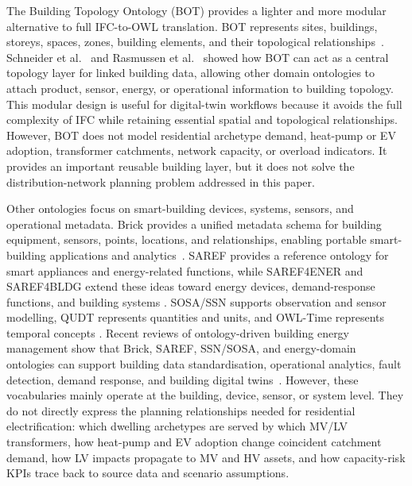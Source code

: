 \documentclass[preprint,12pt]{elsarticle}
\begin{document}
The Building Topology Ontology (BOT) provides a lighter and more modular
alternative to full IFC-to-OWL translation.
BOT represents sites, buildings, storeys, spaces, zones, building elements,
and their topological relationships~\cite{rasmussen_bot_2020}.
Schneider et al.~\cite{schneider_towards_2017} and Rasmussen et
al.~\cite{mads_holten_rasmussen_pieter_pauwels_maxime_lefrancois_georg_ferdinand_schneider_building_nodate} showed how BOT can act as a central topology
layer for linked building data, allowing other domain ontologies to attach
product, sensor, energy, or operational information to building topology.
This modular design is useful for digital-twin workflows because it avoids
the full complexity of IFC while retaining essential spatial and
topological relationships.
However, BOT does not model residential archetype demand, heat-pump or EV
adoption, transformer catchments, network capacity, or overload indicators.
It provides an important reusable building layer, but it does not solve the
distribution-network planning problem addressed in this paper.

Other ontologies focus on smart-building devices, systems, sensors, and
operational metadata.
Brick provides a unified metadata schema for building equipment, sensors,
points, locations, and relationships, enabling portable smart-building
applications and analytics~\cite{balaji_brick_2016, balaji_brick_2018, fierro_mortardata_2020}.
SAREF provides a reference ontology for smart appliances and energy-related
functions, while SAREF4ENER and SAREF4BLDG extend these ideas toward energy
devices, demand-response functions, and building systems
\cite{daniele_saref_2015, noauthor_saref4bldg_nodate, poveda-villalon_extending_nodate}.
SOSA/SSN supports observation and sensor modelling, QUDT represents
quantities and units, and OWL-Time represents temporal concepts
\cite{haller_semantic_2019,compton_ssn_2012,qudt_specification_2020,
cox_owltime_2017}.
Recent reviews of ontology-driven building energy management show that
Brick, SAREF, SSN/SOSA, and energy-domain ontologies can support building
data standardisation, operational analytics, fault detection, demand
response, and building digital twins~\cite{bampoulas_ontology_2025,
saffari_ontology_2026,lygerakis_knowledge_2022}.
However, these vocabularies mainly operate at the building, device, sensor,
or system level.
They do not directly express the planning relationships needed for
residential electrification: which dwelling archetypes are served by which
MV/LV transformers, how heat-pump and EV adoption change coincident
catchment demand, how LV impacts propagate to MV and HV assets, and how
capacity-risk KPIs trace back to source data and scenario assumptions.
\end{document}
